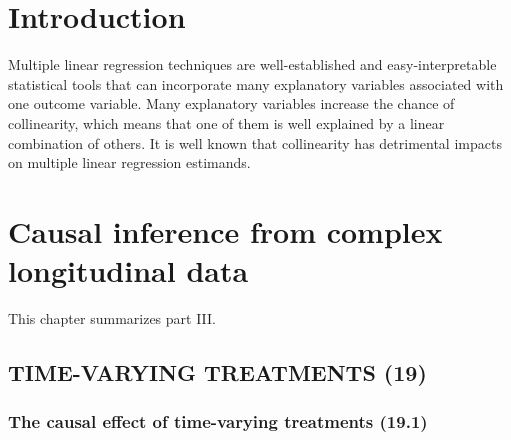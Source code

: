 \documentclass[11pt,a4paper,twoside]{book}\usepackage[]{graphicx}\usepackage[]{xcolor}
\begin{document}


\cleardoublepage
{}






\chapter{Introduction}

Multiple linear regression techniques are well-established and easy-interpretable statistical tools that can incorporate many explanatory variables associated with one outcome variable. Many explanatory variables increase the chance of collinearity, which means that one of them is well explained by a linear combination of others. It is well known that collinearity has detrimental impacts on multiple linear regression estimands.






\chapter{Causal inference from complex longitudinal data}\label{chap:methods}

This chapter summarizes \cite{hernan2023} part III.

\section{TIME-VARYING TREATMENTS (19)}

\subsection{The causal effect of time-varying treatments (19.1)}
\end{document}
